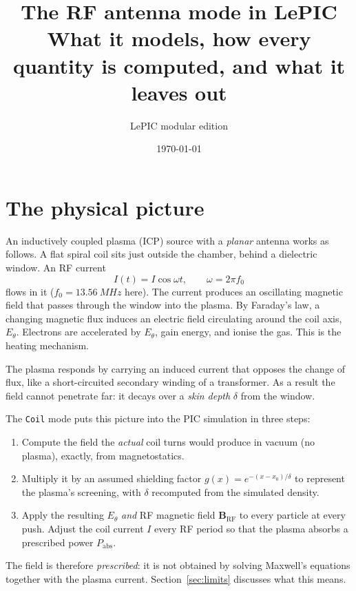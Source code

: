 \documentclass[11pt,a4paper]{article}
\title{The \code{Coil} RF antenna mode in LePIC\\[4pt]
\large What it models, how every quantity is computed, and what it leaves out}
\author{LePIC modular edition}
\date{\today}
\newcommand{\code}[1]{\texttt{#1}}
\begin{document}
\maketitle
\tableofcontents
\bigskip

\section{The physical picture}

An inductively coupled plasma (ICP) source with a \emph{planar} antenna
works as follows. A flat spiral coil sits just outside the chamber, behind a
dielectric window. An RF current
\begin{equation}
  I(t) = I\cos\omega t, \qquad \omega = 2\pi f_0
\end{equation}
flows in it ($f_0 = \SI{13.56}{MHz}$ here). The current produces an
oscillating magnetic field that passes through the window into the plasma.
By Faraday's law, a changing magnetic flux induces an electric field
circulating around the coil axis, $E_\theta$. Electrons are accelerated by
$E_\theta$, gain energy, and ionise the gas. This is the heating mechanism.

The plasma responds by carrying an induced current that opposes the change
of flux, like a short-circuited secondary winding of a transformer. As a
result the field cannot penetrate far: it decays over a \emph{skin depth}
$\delta$ from the window.

The \code{Coil} mode puts this picture into the PIC simulation in three
steps:
\begin{enumerate}
  \item Compute the field the \emph{actual} coil turns would produce in
        vacuum (no plasma), exactly, from magnetostatics.
  \item Multiply it by an assumed shielding factor
        $g(x) = e^{-(x-x_0)/\delta}$ to represent the plasma's screening,
        with $\delta$ recomputed from the simulated density.
  \item Apply the resulting $E_\theta$ \emph{and} RF magnetic field
        $\mathbf B_{\mathrm{RF}}$ to every particle at every push. Adjust the
        coil current $I$ every RF period so that the plasma absorbs a
        prescribed power $P_{\mathrm{abs}}$.
\end{enumerate}
The field is therefore \emph{prescribed}: it is not obtained by solving
Maxwell's equations together with the plasma current. Section~\ref{sec:limits}
discusses what this means.
\end{document}
